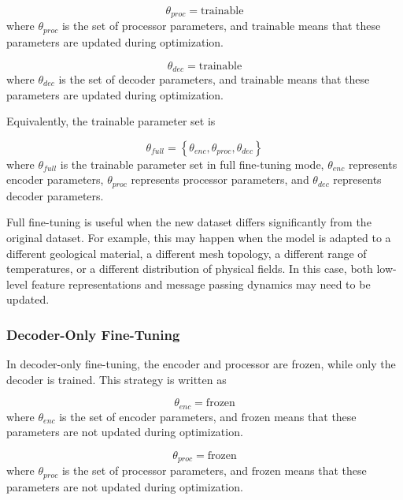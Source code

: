 \begin{equation}
\theta_{proc}
=
\text{trainable}
\end{equation}
where \(\theta_{proc}\) is the set of processor parameters, and \(\text{trainable}\) means that these parameters are updated during optimization.

\begin{equation}
\theta_{dec}
=
\text{trainable}
\end{equation}
where \(\theta_{dec}\) is the set of decoder parameters, and \(\text{trainable}\) means that these parameters are updated during optimization.

Equivalently, the trainable parameter set is

\begin{equation}
\theta_{full}
=
\left\{
\theta_{enc},
\theta_{proc},
\theta_{dec}
\right\}
\end{equation}
where \(\theta
_{full}\) is the trainable parameter set in full fine-tuning mode, \(\theta_{enc}\) represents encoder parameters, \(\theta_{proc}\) represents processor parameters, and \(\theta_{dec}\) represents decoder parameters.

Full fine-tuning is useful when the new dataset differs significantly from the original dataset. For example, this may happen when the model is adapted to a different geological material, a different mesh topology, a different range of temperatures, or a different distribution of physical fields. In this case, both low-level feature representations and message passing dynamics may need to be updated.

\subsubsection{Decoder-Only Fine-Tuning}

In decoder-only fine-tuning, the encoder and processor are frozen, while only the decoder is trained. This strategy is written as

\begin{equation}
\theta_{enc}
=
\text{frozen}
\end{equation}
where \(\theta_{enc}\) is the set of encoder parameters, and \(\text{frozen}\) means that these parameters are not updated during optimization.

\begin{equation}
\theta_{proc}
=
\text{frozen}
\end{equation}
where \(\theta_{proc}\) is the set of processor parameters, and \(\text{frozen}\) means that these parameters are not updated during optimization.

